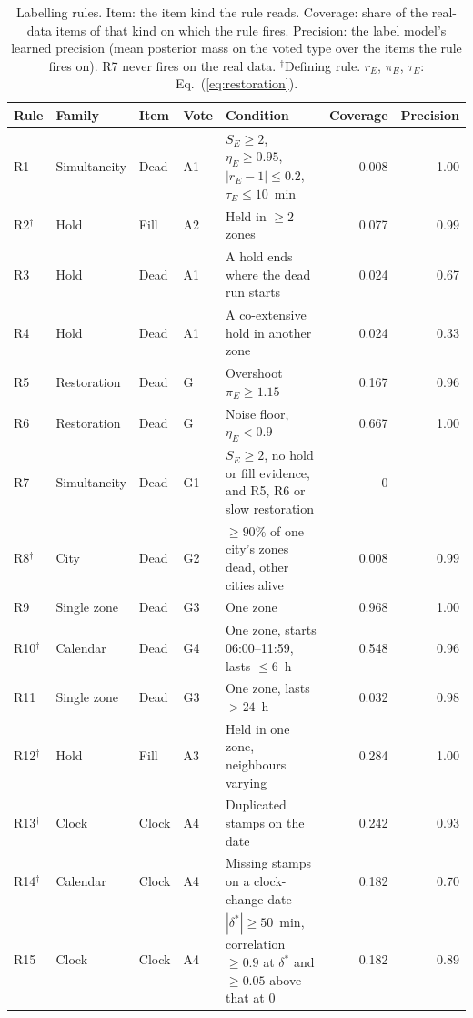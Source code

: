 \begin{table}[htbp]
\centering
\caption{Labelling rules. Item: the item kind the rule reads. Coverage: share of the real-data items of that kind on which the rule fires. Precision: the label model's learned precision (mean posterior mass on the voted type over the items the rule fires on). R7 never fires on the real data. $^{\dagger}$Defining rule. $r_E$, $\pi_E$, $\tau_E$: Eq.~(\ref{eq:restoration}).}
\label{tab:rules}
\footnotesize
\setlength{\tabcolsep}{3.5pt}
\begin{tabularx}{\textwidth}{@{}l l l l Y r r@{}}
\toprule
Rule & Family & Item & Vote & Condition & Coverage & Precision \\
\midrule
R1 & Simultaneity & Dead & A1 & $S_E \geq 2$, $\eta_E \geq 0.95$, $|r_E - 1| \leq 0.2$, $\tau_E \leq 10$~min & 0.008 & 1.00 \\
R2$^{\dagger}$ & Hold & Fill & A2 & Held in $\geq 2$ zones & 0.077 & 0.99 \\
R3 & Hold & Dead & A1 & A hold ends where the dead run starts & 0.024 & 0.67 \\
R4 & Hold & Dead & A1 & A co-extensive hold in another zone & 0.024 & 0.33 \\
R5 & Restoration & Dead & G & Overshoot $\pi_E \geq 1.15$ & 0.167 & 0.96 \\
R6 & Restoration & Dead & G & Noise floor, $\eta_E < 0.9$ & 0.667 & 1.00 \\
R7 & Simultaneity & Dead & G1 & $S_E \geq 2$, no hold or fill evidence, and R5, R6 or slow restoration & 0 & -- \\
R8$^{\dagger}$ & City & Dead & G2 & $\geq 90\%$ of one city's zones dead, other cities alive & 0.008 & 0.99 \\
R9 & Single zone & Dead & G3 & One zone & 0.968 & 1.00 \\
R10$^{\dagger}$ & Calendar & Dead & G4 & One zone, starts 06:00--11:59, lasts $\leq 6$~h & 0.548 & 0.96 \\
R11 & Single zone & Dead & G3 & One zone, lasts $> 24$~h & 0.032 & 0.98 \\
R12$^{\dagger}$ & Hold & Fill & A3 & Held in one zone, neighbours varying & 0.284 & 1.00 \\
R13$^{\dagger}$ & Clock & Clock & A4 & Duplicated stamps on the date & 0.242 & 0.93 \\
R14$^{\dagger}$ & Calendar & Clock & A4 & Missing stamps on a clock-change date & 0.182 & 0.70 \\
R15 & Clock & Clock & A4 & $|\delta^*| \geq 50$~min, correlation $\geq 0.9$ at $\delta^*$ and $\geq 0.05$ above that at 0 & 0.182 & 0.89 \\

\end{tabularx}
\end{table}

